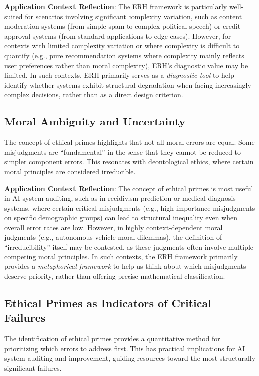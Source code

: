 \documentclass[12pt,a4paper]{article}
\theoremstyle{definition}
\theoremstyle{remark}
\begin{document}
\textbf{Application Context Reflection}: The ERH framework is particularly well-suited for scenarios involving significant complexity variation, such as content moderation systems (from simple spam to complex political speech) or credit approval systems (from standard applications to edge cases). However, for contexts with limited complexity variation or where complexity is difficult to quantify (e.g., pure recommendation systems where complexity mainly reflects user preferences rather than moral complexity), ERH's diagnostic value may be limited. In such contexts, ERH primarily serves as a \emph{diagnostic tool} to help identify whether systems exhibit structural degradation when facing increasingly complex decisions, rather than as a direct design criterion.

\subsection{Moral Ambiguity and Uncertainty}

The concept of ethical primes highlights that not all moral errors are equal. Some misjudgments are ``fundamental'' in the sense that they cannot be reduced to simpler component errors. This resonates with deontological ethics, where certain moral principles are considered irreducible.

\textbf{Application Context Reflection}: The concept of ethical primes is most useful in AI system auditing, such as in recidivism prediction or medical diagnosis systems, where certain critical misjudgments (e.g., high-importance misjudgments on specific demographic groups) can lead to structural inequality even when overall error rates are low. However, in highly context-dependent moral judgments (e.g., autonomous vehicle moral dilemmas), the definition of ``irreducibility'' itself may be contested, as these judgments often involve multiple competing moral principles. In such contexts, the ERH framework primarily provides a \emph{metaphorical framework} to help us think about which misjudgments deserve priority, rather than offering precise mathematical classification.

\subsection{Ethical Primes as Indicators of Critical Failures}

The identification of ethical primes provides a quantitative method for prioritizing which errors to address first. This has practical implications for AI system auditing and improvement, guiding resources toward the most structurally significant failures.
\end{document}
